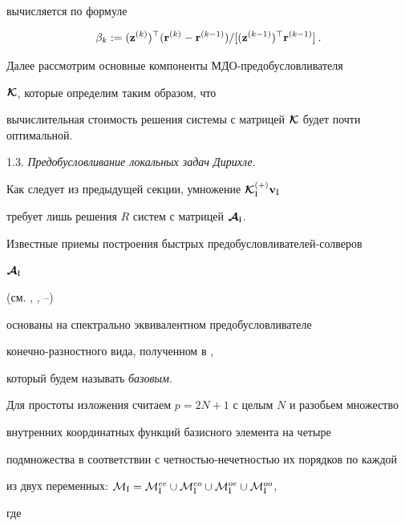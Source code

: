 вычисляется по формуле


\begin{equation}\label{betak}


\beta_k:=({\bold z}^{(k)})^\top ( {\bold r}^{(k)}-{\bold r}^{(k-1)}) /


[({\bold z}^{(k-1)})^\top{\bold r}^{(k-1)}]\:.


\end{equation}





Далее рассмотрим основные компоненты МДО-предобусловливателя


$\boldsymbol {\cal K}$, которые определим таким образом, что


вычислительная стоимость решения системы с матрицей $\bi{\cal


K}$ будет почти оптимальной.


\medskip





1.3. {\it Предобусловливание локальных задач Дирихле}. \label{ss:1.3}


Как следует из предыдущей секции, умножение ${\boldsymbol{\cal {K}}}_{\mathrm{I}}^{(+)}{\bold v}_{\mathrm{I}}$


требует лишь решения $R$ систем с матрицей ${\boldsymbol {\cal {A}}}_{\mathrm{I}}$.


Известные приемы построения быстрых предобусловливателей-солверов


${\boldsymbol {\cal {A}}}_{\mathrm{I}}$


(см. \cite{B2002}, \cite{BSS2002}, \cite{K2001}--\cite{Korneev:02b})


основаны на спектрально эквивалентном предобусловливателе 


конечно-разностного вида, полученном в \cite{KI1996},


который будем называть {\em базовым}.


Для простоты изложения считаем $p=2N+1$ с целым $N$ и разобьем множество 


внутренних координатных функций базисного элемента на четыре


подмножества в соответствии с четностью-нечетностью их порядков по каждой 


из двух переменных: ${\cal M}_\ri={\cal M}^{ee}_\ri\cup


{\cal M}^{eo}_\ri\cup {\cal M}^{oe}_\ri\cup {\cal M}^{oo}_\ri$,


где


